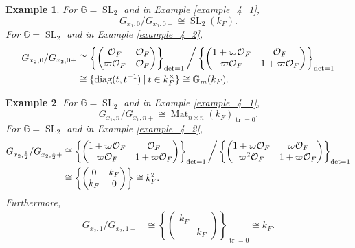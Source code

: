 \documentclass[10pt]{article}
\newtheorem{example}{Example}[section]
\numberwithin{equation}{theorem}
\DeclareMathOperator{\tr}{tr}
\DeclareMathOperator{\SL}{SL}
\DeclareMathOperator{\Mat}{Mat}
\newcommand{\Ouv}[0]{\mathcal{O}}
\newcommand{\G}[0]{\mathbb{G}}
\newcommand{\diag}[0]{\mathrm{diag}}
\newcommand{\sep}[0]{\:|\:}
\begin{document}
\begin{example}
    For $\G=\SL_2$ and in Example \ref{example_4_1},
    \begin{equation*}
        G_{x_1,0}/G_{x_1,0+}\cong \SL_2(k_F).
    \end{equation*}
    For $\G=\SL_2$ and in Example \ref{example_4_2},
    \begin{align*}
        G_{x_2,0}/G_{x_2,0+}&\cong \left\{ \begin{pmatrix}
        \Ouv_F & \Ouv_F \\ \varpi\Ouv_F & \Ouv_F
        \end{pmatrix}\right\}_{\det=1}\bigg{/}\left\{ \begin{pmatrix}
        1+\varpi\Ouv_F & \Ouv_F \\ \varpi\Ouv_F & 1+\varpi \Ouv_F
        \end{pmatrix}\right\}_{\det=1}\\
        &\cong \{\diag(t,t^{-1})\sep t\in k_F^\times\}\cong \G_m(k_F).
    \end{align*}
\end{example}
\begin{example}
    For $\G=\SL_2$ and in Example \ref{example_4_1},
    \begin{equation*}
        G_{x_1,n}/G_{x_1,n+}\cong \Mat_{n\times n}(k_F)_{\tr=0}.
    \end{equation*}
    For $\G=\SL_2$ and in Example \ref{example_4_2},
    \begin{align*}
        G_{x_2,{\frac 1 2}}/G_{x_2,{\frac 1 2}+}&\cong \left\{ \begin{pmatrix}
        1+\varpi\Ouv_F & \Ouv_F \\ \varpi\Ouv_F & 1+\varpi\Ouv_F
        \end{pmatrix}\right\}_{\det=1}\bigg{/}\left\{ \begin{pmatrix}
        1+\varpi\Ouv_F & \varpi\Ouv_F \\ \varpi^2\Ouv_F & 1+\varpi \Ouv_F
        \end{pmatrix}\right\}_{\det=1}\\
        &\cong \left\{\begin{pmatrix}
        0 & k_F\\ k_F & 0
        \end{pmatrix}\right\}\cong k_F^2.
    \end{align*}
    Furthermore,
    \begin{align*}
        G_{x_2,1}/G_{x_2,1+}&\cong \left\{\begin{pmatrix}
            k_F & \: \\ \:& k_F
        \end{pmatrix}\right\}_{\tr=0}\cong k_F.
    \end{align*}
\end{example}
\end{document}
